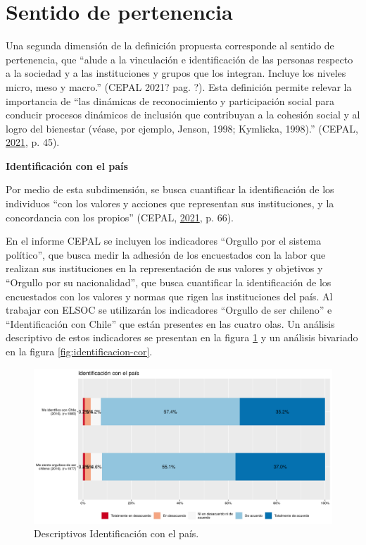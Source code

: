 \documentclass[
  12pt,
]{book}
\begin{document}
\hypertarget{sentido-de-pertenencia}{%
\section{Sentido de pertenencia}\label{sentido-de-pertenencia}}

Una segunda dimensión de la definición propuesta corresponde al sentido de pertenencia, que ``alude a la vinculación e identificación de las personas respecto a la sociedad y a las instituciones y grupos que los integran. Incluye los niveles micro, meso y macro.'' (CEPAL 2021? pag. ?). Esta definición permite relevar la importancia de ``las dinámicas de reconocimiento y participación social para conducir procesos dinámicos de inclusión que contribuyan a la cohesión social y al logro del bienestar (véase, por ejemplo, Jenson, 1998; Kymlicka, 1998).'' (CEPAL, \protect\hyperlink{ref-cepal_Cohesion_2021}{2021}, p. 45).

\textbf{Identificación con el país}

Por medio de esta subdimensión, se busca cuantificar la identificación de los individuos ``con los valores y acciones que representan sus instituciones, y la concordancia con los propios'' (CEPAL, \protect\hyperlink{ref-cepal_Cohesion_2021}{2021}, p. 66).

En el informe CEPAL se incluyen los indicadores ``Orgullo por el sistema político'', que busca medir la adhesión de los encuestados con la labor que realizan sus instituciones en la representación de sus valores y objetivos y ``Orgullo por su nacionalidad'', que busca cuantificar la identificación de los encuestados con los valores y normas que rigen las instituciones del país. Al trabajar con ELSOC se utilizarán los indicadores ``Orgullo de ser chileno'' e ``Identificación con Chile'' que están presentes en las cuatro olas. Un análisis descriptivo de estos indicadores se presentan en la figura \ref{fig:identificacion} y un análisis bivariado en la figura \ref{fig:identificacion-cor}.

\begin{figure}[H]

{\centering \includegraphics[width=1\linewidth,height=1\textheight]{output/graphs/identificacion} 

}

\caption{Descriptivos Identificación con el país.}\label{fig:identificacion}
\end{figure}
\end{document}
